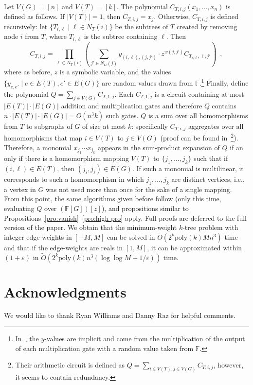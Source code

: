 \documentclass{llncs}
\newcommand{\poly}{\mathrm{poly}}
\newcommand{\FF}{\mathbb{F}}
\newcommand{\FG}{{\FF[G]}}
\newcommand{\abs}[1]{\lvert #1 \rvert}
\begin{document}
Let $V(G)=[n]$ and $V(T)=[k]$. The polynomial $C_{T,i,j}(x_1,\ldots,x_n)$ is defined as follows. If $\abs{V(T)}=1$, then $C_{T,i,j}=x_j$. Otherwise, $C_{T,i,j}$ is defined recursively:  let $\{T_{i,\ell} \mid \ell \in N_T(i)\}$ be the subtrees of $T$ created by removing node $i$ from $T$, where $T_{i,\ell}$ is the subtree containing $\ell$. Then 
\begin{equation}
C_{T,i,j} = \prod_{\ell \in N_T(i)}\left( \sum_{j'\in N_G(j)} y_{(i,\ell), (j,j')} \cdot z^{w(j,j')} C_{T_{i,\ell},\ell,j'} \right)\enspace,
\end{equation}
where as before, $z$ is a symbolic variable, and the values $\{y_{e, e'} \mid e \in E(T), e' \in E(G)\}$ are random values drawn from $\FF$.\footnote{In~\cite{KW09}, the $y$-values are implicit and come from the multiplication of the output of each multiplication gate with a random value taken from $\FF$.}
Finally, define the polynomial $Q = \sum_{j\in V(G)} C_{T,1,j}$. Each $C_{T,1,j}$ is a circuit containing at most $\abs{E(T)}\cdot \abs{E(G)}$ addition and multiplication gates and therefore $Q$ contains $n \cdot \abs{E(T)}\cdot \abs{E(G)} = O(n^3 k)$ such gates. 
$Q$ is a sum over all homomorphisms from $T$ to subgraphs of $G$ of size at most $k$: specifically $C_{T,i,j}$ aggregates over all homomorphisms that map $i\in V(T)$ to $j \in V(G)$ (proof can be found in~\cite{KW09}\footnote{Their arithmetic circuit is defined as $Q = \sum_{i \in V(T),j\in V(G)} C_{T,i,j}$, however, it seems to contain redundancy.}). Therefore, a monomial $x_{j_1}\cdots x_{j_k}$ appears in the sum-product expansion of $Q$ if an only if there is a homomorphism mapping $V(T)$ to $\{j_1,\ldots, j_k\}$ such that if $(i,\ell)\in E(T)$, then $(j_i, j_\ell) \in E(G)$. If such a monomial is multilinear, it corresponds to such a homomorphism in which $j_1,\ldots, j_k$ are distinct vertices, i.e., a vertex in $G$ was not used more than once for the sake of a single mapping. From this point, the same algorithms given before follow (only this time, evaluating $Q$ over $(\FG)[z]$), and propositions similar to Propositions~\ref{pro:vanish}--\ref{pro:high-pro} apply. Full proofs are deferred to the full version of the paper. We obtain that the minimum-weight $k$-tree problem with integer edge-weights in $[-M,M]$ can be solved in $\tilde{O}(2^k \poly(k) M n^3)$ time and that if the edge-weights are reals in $[1,M]$, it can be approximated within $(1+\varepsilon)$ in $\tilde{O}(2^k \poly(k) n^3(\log\log M + 1/\varepsilon))$ time.
\section{Acknowledgments}
We would like to thank Ryan Williams and Danny Raz for helpful comments.
\end{document}
